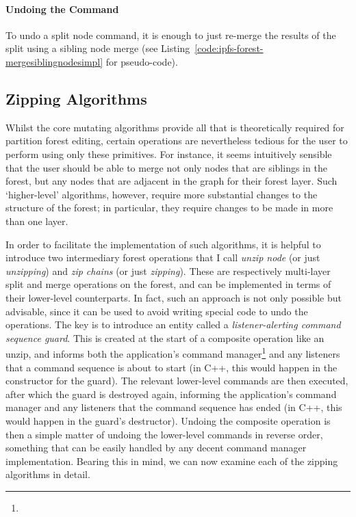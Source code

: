 \paragraph{Undoing the Command}

To undo a split node command, it is enough to just re-merge the results of the split using a sibling node merge (see Listing~\ref{code:ipfs-forest-mergesiblingnodesimpl} for pseudo-code).


\afterpage{\clearpage}
\newpage

\subsection{Zipping Algorithms}

Whilst the core mutating algorithms provide all that is theoretically required for partition forest editing, certain operations are nevertheless tedious for the user to perform using only these primitives. For instance, it seems intuitively sensible that the user should be able to merge not only nodes that are siblings in the forest, but any nodes that are adjacent in the graph for their forest layer. Such `higher-level' algorithms, however, require more substantial changes to the structure of the forest; in particular, they require changes to be made in more than one layer.

In order to facilitate the implementation of such algorithms, it is helpful to introduce two intermediary forest operations that I call \emph{unzip node} (or just \emph{unzipping}) and \emph{zip chains} (or just \emph{zipping}). These are respectively multi-layer split and merge operations on the forest, and can be implemented in terms of their lower-level counterparts. In fact, such an approach is not only possible but advisable, since it can be used to avoid writing special code to undo the operations. The key is to introduce an entity called a \emph{listener-alerting command sequence guard}. This is created at the start of a composite operation like an unzip, and informs both the application's command manager\footnote{} and any listeners that a command sequence is about to start (in C++, this would happen in the constructor for the guard). The relevant lower-level commands are then executed, after which the guard is destroyed again, informing the application's command manager and any listeners that the command sequence has ended (in C++, this would happen in the guard's destructor). Undoing the composite operation is then a simple matter of undoing the lower-level commands in reverse order, something that can be easily handled by any decent command manager implementation. Bearing this in mind, we can now examine each of the zipping algorithms in detail.

